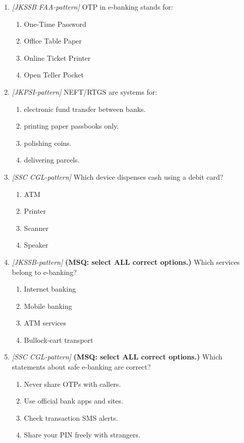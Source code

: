 \documentclass[11pt]{article}
\begin{document}
\begin{enumerate}[label=\textbf{Q\arabic*.}, leftmargin=*]
\item \textit{[JKSSB FAA-pattern]} OTP in e-banking stands for:
  \begin{enumerate}[label=\Alph*.]
    \item One-Time Password
    \item Office Table Paper
    \item Online Ticket Printer
    \item Open Teller Pocket
  \end{enumerate}
\item \textit{[JKPSI-pattern]} NEFT/RTGS are systems for:
  \begin{enumerate}[label=\Alph*.]
    \item electronic fund transfer between banks.
    \item printing paper passbooks only.
    \item polishing coins.
    \item delivering parcels.
  \end{enumerate}
\item \textit{[SSC CGL-pattern]} Which device dispenses cash using a debit card?
  \begin{enumerate}[label=\Alph*.]
    \item ATM
    \item Printer
    \item Scanner
    \item Speaker
  \end{enumerate}
\item \textit{[JKSSB-pattern]} \textbf{(MSQ: select ALL correct options.)} Which services belong to e-banking?
  \begin{enumerate}[label=\Alph*.]
    \item Internet banking
    \item Mobile banking
    \item ATM services
    \item Bullock-cart transport
  \end{enumerate}
\item \textit{[SSC CGL-pattern]} \textbf{(MSQ: select ALL correct options.)} Which statements about safe e-banking are correct?
  \begin{enumerate}[label=\Alph*.]
    \item Never share OTPs with callers.
    \item Use official bank apps and sites.
    \item Check transaction SMS alerts.
    \item Share your PIN freely with strangers.
  \end{enumerate}
\end{enumerate}
\def\JKSSBLessonID{39}\def\JKSSBAnswers{0}
\end{document}
